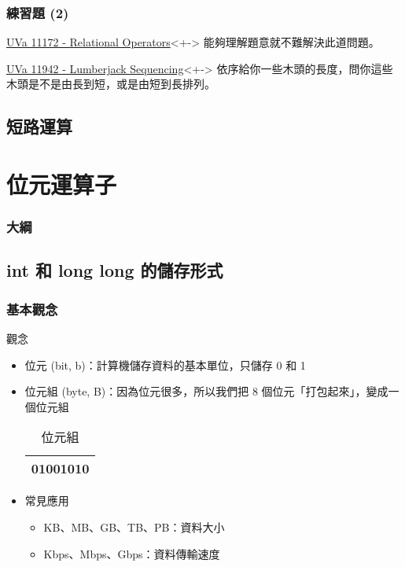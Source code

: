 \documentclass[utf8]{beamer}
\begin{document}
\begin{CJK}{UTF8}{bkai}
\begin{frame}
  \frametitle{練習題 (2)}
  \begin{exampleblock}{\href{http://unfortunate-dog.github.io/articles/111/p11172/}{UVa 11172 - Relational Operators}}<+->
  \label{uva:11172}
  能夠理解題意就不難解決此道問題。
  \end{exampleblock}
  \begin{exampleblock}{\href{http://unfortunate-dog.github.io/articles/119/p11942/}{UVa 11942 - Lumberjack Sequencing}}<+->
  \label{uva:11942}
  依序給你一些木頭的長度，問你這些木頭是不是由長到短，或是由短到長排列。
  \end{exampleblock}
\end{frame}

\subsection{短路運算}

\section{位元運算子}
\begin{frame}
  \frametitle{大綱}
  \begin{multicols}{2}
    \tableofcontents[currentsection]
  \end{multicols}
\end{frame}

\subsection{int 和 long long 的儲存形式}

\begin{frame}[fragile]
  \frametitle{基本觀念}
  \begin{exampleblock}{觀念}
    \begin{itemize}[<+->]
    \item \alert{位元} (bit, b)：計算機儲存資料的基本單位，只儲存 \alert{0 和 1}
    \item \alert{位元組} (byte, B)：因為位元很多，所以我們把 8 個位元「打包起來」，變成一個位元組
      \begin{table}[h]
        \begin{tabular}{|c|}
        \hline
        01001010\\
        \hline
        \end{tabular}
        \caption{位元組}
      \end{table}
    \item 常見應用
      \begin{itemize}[<+->]
      \item KB、MB、GB、TB、PB：資料大小
      \item Kbps、Mbps、Gbps：資料傳輸速度
      \end{itemize}
    \end{itemize}
  \end{exampleblock}
\end{frame}


\end{CJK}
\end{document}
